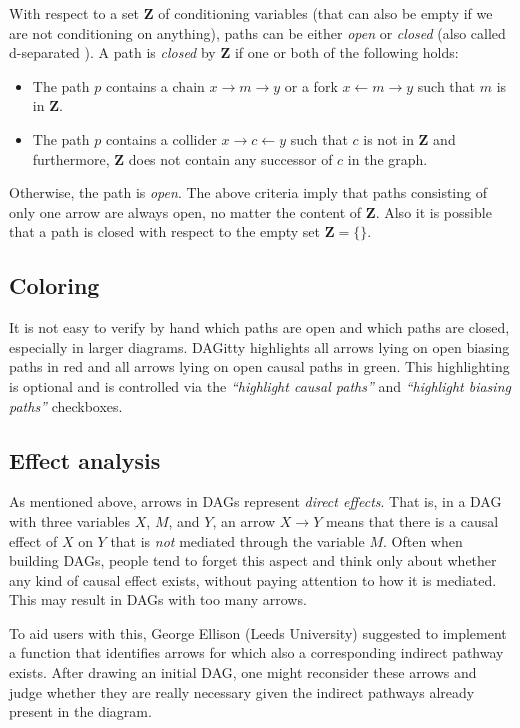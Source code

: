 \documentclass[a4paper,10pt]{article}
\newcommand{\pname}{{\sc DAG}itty\xspace}
\newcommand{\action}[1]{\emph{``#1''}}
\begin{document}
With respect to a set $\mathbf{Z}$ of conditioning variables (that 
can also be empty if we are not conditioning on anything), 
paths can be either \emph{open} or \emph{closed}
(also called d-separated \cite{Pearl2009}). A path 
is \emph{closed} by $\mathbf{Z}$ if one or both of the following holds: 

\begin{itemize}
 \item The path $p$ contains a chain $x \rightarrow m \rightarrow y$ 
 	or a fork $x \leftarrow m \rightarrow y$ 
    such that $m$ is in $\mathbf{Z}$.
 \item The path $p$ contains a collider $x \rightarrow c \leftarrow y$ 
 	such that $c$ is not in $\mathbf{Z}$ and 
    furthermore, $\mathbf{Z}$ does not contain
    any successor of $c$ in the graph. 
\end{itemize}

Otherwise, the path is \emph{open}.
The above criteria imply that paths consisting of only one
arrow are always open, no matter the content of $\mathbf{Z}$. 
Also it is possible that a path is closed with respect
to the empty set $\mathbf{Z}=\{\}$.

\subsection{Coloring}

It is not easy to verify by hand which paths are open and
which paths are closed, especially in larger diagrams. 
\pname highlights all arrows lying on open 
biasing paths in red and all arrows lying on open
causal paths in green. This highlighting is optional 
and is controlled via 
the \action{highlight causal paths} and \action{highlight biasing paths}
checkboxes.

\subsection{Effect analysis}

As mentioned above, arrows in DAGs represent \emph{direct effects}. That is, in a DAG
with three variables $X$, $M$, and $Y$, an arrow $X \to Y$ means that there is a causal
effect of $X$ on $Y$ that is \emph{not} mediated through the variable $M$. 
Often when building DAGs, people tend to forget this aspect and think only about whether
any kind of causal effect exists, without paying attention to how it is mediated. This 
may result in DAGs with too many arrows. 

To aid users with this, George Ellison (Leeds University) suggested to implement a 
function that identifies arrows for which also a corresponding indirect pathway exists. 
After drawing an initial DAG, one might reconsider these arrows and judge whether they
are really necessary given the indirect pathways already present in the diagram.
\end{document}
